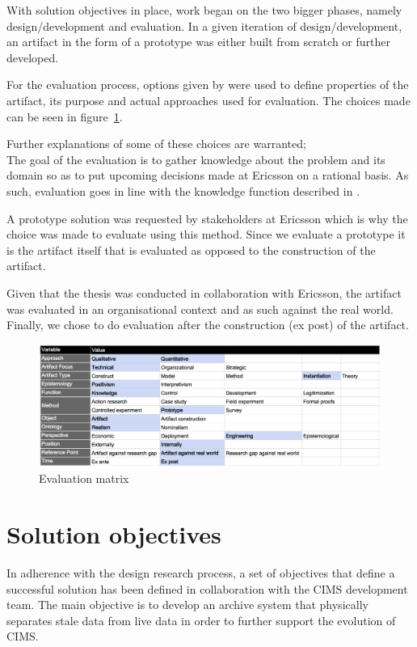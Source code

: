 With solution objectives in place, work began on the two bigger phases, namely design/development and evaluation. In a given iteration of design/development, an artifact in the form of a prototype was either built from scratch or further developed.

For the evaluation process, options given by \cite{DesignEval} were used to define properties of the artifact, its purpose and actual approaches used for evaluation. The choices made can be seen in figure~\ref{fig:matrix}.

Further explanations of some of these choices are warranted;\\
The goal of the evaluation is to gather knowledge about the problem and its domain so as to put upcoming decisions made at Ericsson on a rational basis. As such, evaluation goes in line with the knowledge function described in \cite{DesignEval}.

A prototype solution was requested by stakeholders at Ericsson which is why the choice was made to evaluate using this method. Since we evaluate a prototype it is the artifact itself that is evaluated as opposed to the construction of the artifact.

Given that the thesis was conducted in collaboration with Ericsson, the artifact was evaluated in an organisational context and as such against the real world. Finally, we chose to do evaluation after the construction (ex post) of the artifact.

\begin{figure}[h!]
\centering
\includegraphics[width=0.7\pdfpagewidth]{figure/eval.png}
\caption{Evaluation matrix}
\label{fig:matrix}
\end{figure}


\section{Solution objectives}
In adherence with the design research process, a set of objectives that define a successful solution has been defined in collaboration with the CIMS development team. The main objective is to develop an archive system that physically separates stale data from live data in order to further support the evolution of CIMS.

